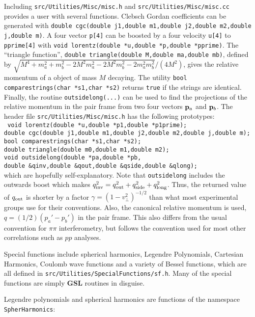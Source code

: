 \documentclass[10pt]{article}
\def\tab{\hspace*{9pt}}
\begin{document}
Including {\tt src/Utilities/Misc/misc.h} and {\tt src/Utilities/Misc/misc.cc} provides a user with several functions.  Clebsch Gordan coefficients can be generated with {\tt double cgc(double j1,double m1,double j2,double m2,double j,double m)}. A four vector {\tt p[4]} can be boosted by a four velocity {\tt u[4]} to {\tt pprime[4]} with {\tt void lorentz(double *u,double *p,double *pprime)}. The ``triangle function'', {\tt double triangle(double M,double ma,double mb)}, defined by $\sqrt{M^4+m_a^2+m_b^2 -2M^2m_a^2-2M^2m_b^2-2m_a^2m_b^2}/(4M^2)$, gives the relative momentum of a object of mass $M$ decaying. The utility {\tt bool comparestrings(char *s1,char *s2)} returns {\tt true} if the strings are identical. Finally, the routine {\tt outsidelong(...)} can be used to find the projections of the relative momentum in the pair frame from two four vectors ${\bf p}_a$ and ${\bf p}_b$. The header file {\tt src/Utilities/Misc/misc.h} has the following prototypes:\\
{\tt
\tab void lorentz(double *u,double *p1,double *p1prime);\\
\tab double cgc(double j1,double m1,double j2,double m2,double j,double m);\\
\tab bool comparestrings(char *s1,char *s2);\\
\tab double triangle(double m0,double m1,double m2);\\
\tab void outsidelong(double *pa,double *pb,\\
\tab\tab double \&qinv,double \&qout,double \&qside,double \&qlong);}\\
which are hopefully self-explanatory. Note that {\tt outsidelong} includes the outwards boost which makes $q_{\rm inv}^2=q_{\rm out}^2+q_{\rm side}^2+q_{\rm long}^2$. Thus, the returned value of $q_{\rm out}$ is shorter by a factor $\gamma=(1-v_\perp^2)^{-1/2}$ than what most experimental groups use for their conventions. Also, the canonical relative momentum is used, $q=(1/2)(p_a'-p_b')$ in the pair frame. This also differs from the usual convention for $\pi\pi$ interferometry, but follows the convention used for most other correlations such as $pp$ analyses.

Special functions include spherical harmonics, Legendre Polynomials, Cartesian Harmonics, Coulomb wave functions and a variety of Bessel functions, which are all defined in {\tt src/Utilities/SpecialFunctions/sf.h}. Many of the special functions are simply {\bf GSL} routines in disguise.

Legendre polynomials and spherical harmonics are functions of the namespace {\tt SpherHarmonics}:
\end{document}
